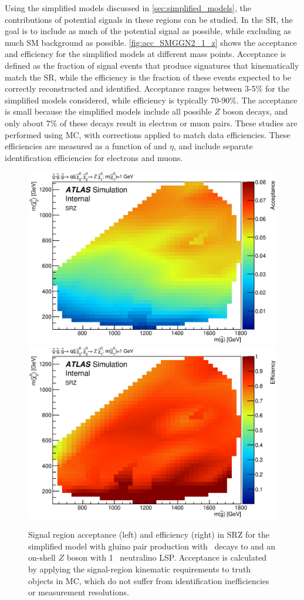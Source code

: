 Using the simplified models discussed in \autoref{sec:simplified_models}, the contributions of potential signals in these regions can be studied. In the \ac{SR}, the goal is to include as much of the potential signal as possible, while excluding as much \ac{SM} background as possible. \autoref{fig:acc_SMGGN2_1_z} shows the acceptance and efficiency for the simplified models at different mass points. Acceptance is defined as the fraction of signal events that produce signatures that kinematically match the \ac{SR}, while the efficiency is the fraction of these events expected to be correctly reconstructed and identified. Acceptance ranges between 3-5\% for the simplified models considered, while efficiency is typically 70-90\%. The acceptance is small because the simplified models include all possible $Z$ boson decays, and only about 7\% of these decays result in electron or muon pairs. These studies are performed using \ac{MC}, with corrections applied to match data efficiencies. These efficiencies are measured as a function of \pt and $\eta$, and include separate identification efficiencies for electrons and muons. 

\begin{figure}[ht]
\centering
\includegraphics[width=.48\textwidth]{figures/signalacceptcontam/acc_SM_GG_N2_1.eps}
\includegraphics[width=.48\textwidth]{figures/signalacceptcontam/eff_SM_GG_N2_1.eps}
\caption{
Signal region acceptance (left) and efficiency (right) in SRZ for the simplified model with gluino pair production with \chitwozero\ decays to \chionezero and an on-shell $Z$ boson with 1 \gev~neutralino LSP.  
Acceptance is calculated by applying the signal-region kinematic requirements to truth objects in \ac{MC}, which do not suffer from identification inefficiencies or measurement resolutions.
}
\label{fig:acc_SMGGN2_1_z}
\end{figure}

